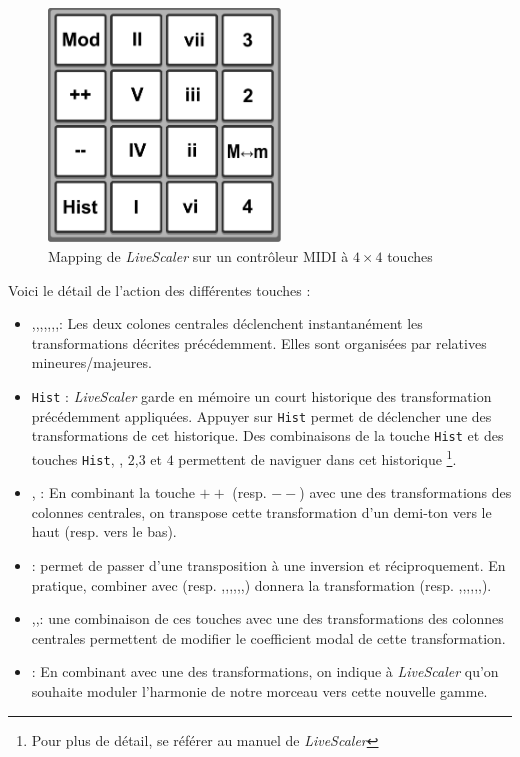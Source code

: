 
\begin{figure}[htbp]
  \centering
  \includegraphics[width=0.55\textwidth]{Figures/Pads-config.pdf}
  \caption{Mapping de \emph{LiveScaler} sur un contrôleur MIDI à $4\times 4$ touches\label{fig:mapping-ATOM}}
\end{figure}

Voici le détail de l'action des différentes touches : 
\begin{itemize}
  \item \LSI,\LSvi,\LSIV,\LSII,\LSV,\LSiii,\LSII,\LSvii :  Les deux colones centrales déclenchent instantanément les transformations décrites précédemment. Elles sont organisées par relatives mineures/majeures.
  \item \texttt{Hist} : \emph{LiveScaler} garde en mémoire un court historique des transformation précédemment appliquées. Appuyer sur \texttt{Hist} permet de déclencher une des transformations de cet historique. Des combinaisons de la touche \texttt{Hist} et des touches \texttt{Hist}, \LSMm, $2$,$3$ et $4$ permettent de naviguer dans cet historique \footnote{Pour plus de détail, se référer au manuel de \emph{LiveScaler}}. 
  \item \LSpp, \LSmm : En combinant la touche $++$ (resp. $--$) avec une des transformations des colonnes centrales, on transpose cette transformation d'un demi-ton vers le haut (resp. vers le bas). 
  \item  \LSMm : permet de passer d'une transposition à une inversion et réciproquement. En pratique, combiner \LSMm avec \LSI (resp. \LSvi,\LSIV,\LSII,\LSV,\LSiii,\LSII,\LSvii) donnera la transformation \LSI (resp. \LSvi,\LSIV,\LSII,\LSV,\LSiii,\LSII,\LSvii).
  \item \LStwo,\LSthree,\LSfour : une combinaison de ces touches avec une des transformations des colonnes centrales permettent de modifier le coefficient modal de cette transformation.
  \item \LSMod : En combinant \LSMod avec une des transformations, on indique à \emph{LiveScaler} qu'on souhaite moduler l'harmonie de notre morceau vers cette nouvelle gamme. 
\end{itemize}

